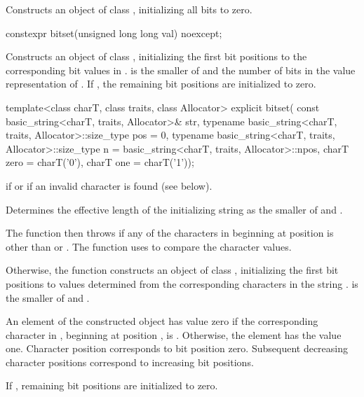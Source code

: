 \begin{itemdescr}
\pnum
\effects
Constructs an object of class
,
initializing all bits to zero.
\end{itemdescr}

%
\begin{itemdecl}
constexpr bitset(unsigned long long val) noexcept;
\end{itemdecl}

\begin{itemdescr}
\pnum
\effects
Constructs an object of class
,
initializing the first  bit positions to the corresponding bit
values in .
 is the smaller of  and the number of bits in the value
representation of .
If , the remaining bit positions are initialized to zero.
\end{itemdescr}

%
\begin{itemdecl}
template<class charT, class traits, class Allocator>
  explicit bitset(
    const basic_string<charT, traits, Allocator>& str,
    typename basic_string<charT, traits, Allocator>::size_type pos = 0,
    typename basic_string<charT, traits, Allocator>::size_type n
      = basic_string<charT, traits, Allocator>::npos,
    charT zero = charT('0'),
    charT one = charT('1'));
\end{itemdecl}

\begin{itemdescr}
\pnum
\throws
{}
if
or  if an invalid character is found (see below).%

\pnum
\effects
Determines the effective length
 of the initializing string as the smaller of
 and
.

The function then throws%
if any of the 
characters in  beginning at position  is
other than  or . The function uses 
to compare the character values.

Otherwise, the function constructs an object of class
,
initializing the first  bit
positions to values determined from the corresponding characters in the string
.
 is the smaller of  and .

\pnum
An element of the constructed object has value zero if the
corresponding character in , beginning at position
, is
.
Otherwise, the element has the value one.
Character position  corresponds to bit position zero.
Subsequent decreasing character positions correspond to increasing bit positions.

\pnum
If , remaining bit positions are initialized to zero.
\end{itemdescr}


